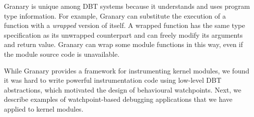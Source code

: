 \documentclass[letterpaper,twocolumn,10pt]{article}
\begin{document}
Granary is unique among DBT systems because it understands and uses program type information. For example, Granary can substitute the execution of a function with a \emph{wrapped} version of itself. A wrapped function has the same type specification as its unwrapped counterpart and can freely modify its arguments and return value. Granary can wrap some module functions in this way, even if the module source code is unavailable.

While Granary provides a framework for instrumenting kernel modules, we found it was hard to write powerful instrumentation code using low-level DBT abstractions, which motivated the design of behavioural watchpoints. Next, we describe examples of watchpoint-based debugging applications that we have applied to kernel modules.





\end{document}

